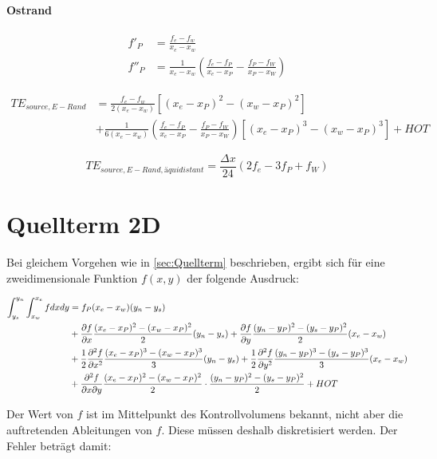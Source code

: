 \documentclass[11pt, ngerman,colorback,accentcolor=tud2d]{tudreport}
\begin{document}
\paragraph{Ostrand}

\begin{align*}
  f'_P &=\frac{f_e-f_w}{x_e-x_w}\\
  f''_P &= \frac{1}{x_e-x_w}\left(\frac{f_e-f_P}{x_e-x_P}-\frac{f_P-f_W}{x_P-x_W}\right)
\end{align*}

\begin{align}
  TE_{source, E-Rand} &=
 \frac{f_e-f_w}{2(x_e-x_w)}  \left[{(x_e-x_P)^2-(x_w-x_P)^2}\right]\nonumber\\
&+\frac{1}{6(x_e-x_w)}\left(\frac{f_e-f_P}{x_e-x_P}-\frac{f_P-f_W}{x_P-x_W}\right)
  \left[{{(x_e-x_P)}^3-{(x_w-x_P)}^3}\right] + HOT
\end{align}

\begin{equation*}
  TE_{source, E-Rand, äquidistant} = \frac{\Delta x}{24} \left({2f_e-3f_P+f_W}\right)
\end{equation*}

\section{Quellterm 2D}

Bei gleichem Vorgehen wie in \ref{sec:Quellterm} beschrieben, ergibt sich für
eine zweidimensionale Funktion $f(x, y)$ der folgende Ausdruck:

\begin{align*}
  \int_{y_s}^{y_n}\int_{x_w}^{x_e} f dx dy &= f_P (x_e-x_w)(y_n-y_s)\\
                                           &+ \frac{\partial f}{\partial x} \frac{(x_e-x_P)^2 - (x_w-x_P)^2}{2} (y_n-y_s)
  + \frac{\partial f}{\partial y} \frac{(y_n-y_P)^2-(y_s-y_P)^2}{2} (x_e-x_w) \\
  &+ \frac{1}{2} \frac{\partial^2 f}{\partial x^2}\frac{(x_e-x_P)^3 - (x_w-x_P)^3}{3} (y_n-y_s)
  + \frac{1}{2} \frac{\partial^2 f}{\partial y^2} \frac{(y_n-y_P)^3-(y_s-y_P)^3}{3} (x_e-x_w) \\
  &+ \frac{\partial^2 f}{\partial x\partial y} \frac{(x_e-x_P)^2 - (x_w-x_P)^2}{2} \cdot  \frac{(y_n-y_P)^2-(y_s-y_P)^2}{2} + HOT
\end{align*}

Der Wert von $f$ ist im Mittelpunkt des Kontrollvolumens bekannt, nicht aber die auftretenden
Ableitungen von $f$. Diese müssen deshalb diskretisiert werden. Der Fehler beträgt damit:
\end{document}
